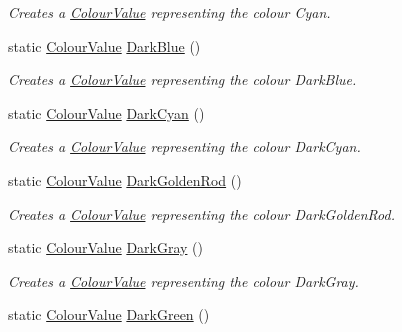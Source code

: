\begin{DoxyCompactItemize}
\begin{DoxyCompactList}\small\item\em Creates a \hyperlink{classMezzanine_1_1ColourValue}{ColourValue} representing the colour Cyan. \item\end{DoxyCompactList}\item 
static \hyperlink{classMezzanine_1_1ColourValue}{ColourValue} \hyperlink{classMezzanine_1_1ColourValue_a9493457236636eaa59c9d9272bfa9c19}{DarkBlue} ()
\begin{DoxyCompactList}\small\item\em Creates a \hyperlink{classMezzanine_1_1ColourValue}{ColourValue} representing the colour DarkBlue. \item\end{DoxyCompactList}\item 
static \hyperlink{classMezzanine_1_1ColourValue}{ColourValue} \hyperlink{classMezzanine_1_1ColourValue_abf9b77f80d5940dee66805c9c57bd6f6}{DarkCyan} ()
\begin{DoxyCompactList}\small\item\em Creates a \hyperlink{classMezzanine_1_1ColourValue}{ColourValue} representing the colour DarkCyan. \item\end{DoxyCompactList}\item 
static \hyperlink{classMezzanine_1_1ColourValue}{ColourValue} \hyperlink{classMezzanine_1_1ColourValue_a5eefd302d731f08a12915dffb613d9e1}{DarkGoldenRod} ()
\begin{DoxyCompactList}\small\item\em Creates a \hyperlink{classMezzanine_1_1ColourValue}{ColourValue} representing the colour DarkGoldenRod. \item\end{DoxyCompactList}\item 
static \hyperlink{classMezzanine_1_1ColourValue}{ColourValue} \hyperlink{classMezzanine_1_1ColourValue_a87523009e838673f10795ea8153fd08b}{DarkGray} ()
\begin{DoxyCompactList}\small\item\em Creates a \hyperlink{classMezzanine_1_1ColourValue}{ColourValue} representing the colour DarkGray. \item\end{DoxyCompactList}\item 
static \hyperlink{classMezzanine_1_1ColourValue}{ColourValue} \hyperlink{classMezzanine_1_1ColourValue_a817de63b05e93abe7a0124657c372785}{DarkGreen} ()

\end{DoxyCompactItemize}
